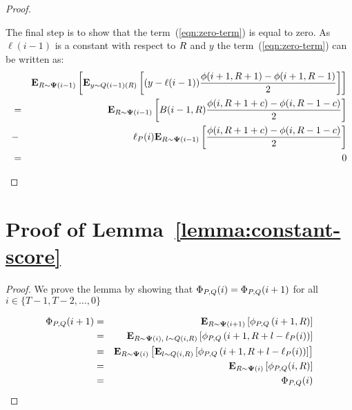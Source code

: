 \documentclass[12pt]{article} %
\begin{document}
\begin{proof}
\begin{enumerate}
The final step is to show that the term~(\ref{eqn:zero-term}) is equal
to zero. As $\ell(i-1)$ is a constant with respect to $R$ and $y$ the
term~(\ref{eqn:zero-term}) can be written as:
\begin{eqnarray}
&&{\bf E}_{R \sim {\bf \Psi}(i-1)}\left[ {\bf E}_{y \sim Q(i-1)(R)}\left[ (y-\ell(i-1))
   \frac{\phi(i+1,R+1)-\phi(i+1,R-1)}{2} \right] \right]\\
&=&
{\bf E}_{R \sim {\bf \Psi}(i-1)}\left[ B(i-1,R)
    \frac{\phi(i,R+1+c)-\phi(i,R-1-c)}{2} \right]\\
  &-& \ell_P(i) {\bf E}_{R \sim {\bf \Psi}(i-1)}\left[ 
    \frac{\phi(i,R+1+c)-\phi(i,R-1-c)}{2} \right]\\
  &=& 0
\end{eqnarray}
\end{enumerate}
\end{proof}

\section{Proof of Lemma~\ref{lemma:constant-score}}
\label{proof:constant-score}
\begin{proof}
We prove the lemma by showing that  $\Phi_{P,Q}(i) = \Phi_{P,Q}(i+1)$ for
all $i \in \{T-1,T-2,\ldots,0\}$

\begin{eqnarray}
  \Phi_{P,Q}(i+1) &=& {\bf E}_{R \sim {\bf \Psi}(i+1)}\left[ \phi_{P,Q} \left(i+1,R \right) \right]\\
                &=& {\bf E}_{R \sim {\bf \Psi}(i),\; l \sim
                    Q(i,R)}\left[ \phi_{P,Q} \left(i+1,R+l-\ell_P(i)
                    \right) \right]\\
                &=& {\bf E}_{R \sim {\bf \Psi}(i)}\left[ {\bf E}_{l \sim
                    Q(i,R)}\left[ \phi_{P,Q} \left(i+1,R+l-\ell_P(i)
                    \right) \right] \right]\\
                &=& {\bf E}_{R \sim {\bf \Psi}(i)}\left[ \phi_{P,Q}(i,R) \right] \\
                &=& \Phi_{P,Q}(i)
\end{eqnarray}
\end{proof}
\end{document}
